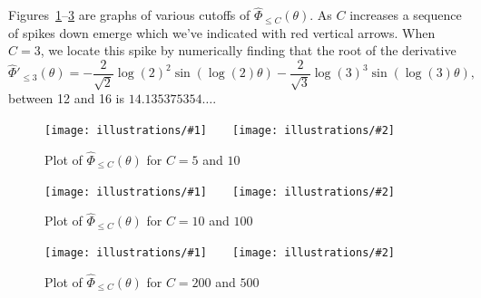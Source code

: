 \documentclass[openany]{book}
\newcommand{\illtwo}[4]{%
   \begin{figure}[H]\centering%
   \texttt{[image: illustrations/\#1]}$\qquad$\texttt{[image: illustrations/\#2]}%
   \caption{#4}%
    \end{figure}}
\theoremstyle{plain}
\theoremstyle{definition}
\begin{document}
Figures~\ref{fig:theta_C-5-10}--\ref{fig:theta_C-200-500}
are graphs of various cutoffs of ${\hat \Phi}_{\leq C}(\theta)$.
As $C$ increases a sequence of spikes down emerge
which we've indicated with red vertical arrows.
When $C=3$, we locate this spike by numerically finding
that the root of the derivative
$$
  {\hat \Phi'}_{\leq 3}(\theta) =
  -\frac{2}{\sqrt{2}} \log(2)^2\sin(\log(2)\theta)
 -\frac{2}{\sqrt{3}} \log(3)^3\sin(\log(3)\theta),
$$
between 12 and 16 is $14.135375354\ldots$.


 \illtwo{theta_C-5}{theta_C-10}{0.45}{Plot of ${\hat \Phi}_{\leq C}(\theta)$ for $C=5$ and $10$\label{fig:theta_C-5-10}}

\illtwo{theta_C-20}{theta_C-100}{0.45}{Plot of ${\hat \Phi}_{\leq C}(\theta)$ for $C=10$ and $100$\label{fig:theta_C-10-100}}

\illtwo{theta_C-200}{theta_C-500}{0.45}{Plot of ${\hat \Phi}_{\leq C}(\theta)$ for $C=200$ and $500$\label{fig:theta_C-200-500}}
\end{document}
